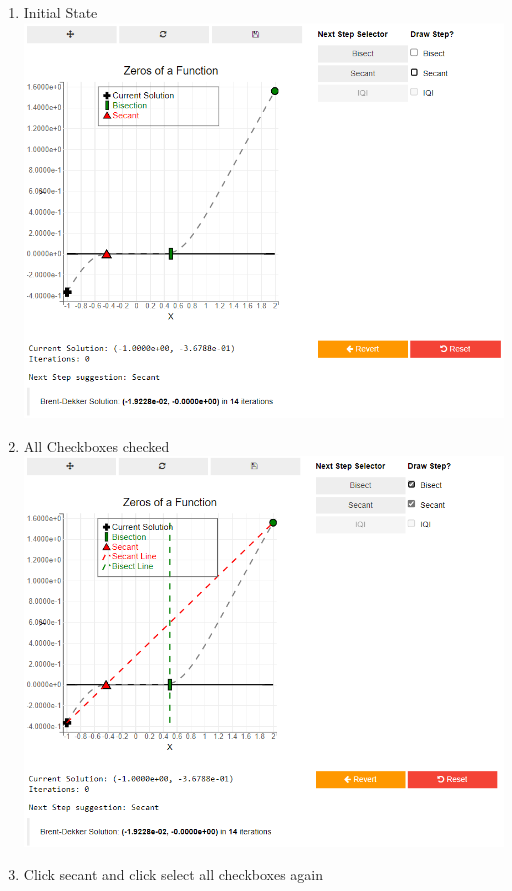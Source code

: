 \begin{enumerate}
    \item Initial State\\
    \includegraphics[scale=0.6]{Include/Images/Thesis/Documentation/Visualizers/NonLinear/Example 2/Example 2 - 00 - Initial State.png}
    \item All Checkboxes checked\\
    \includegraphics[scale=0.6]{Include/Images/Thesis/Documentation/Visualizers/NonLinear/Example 2/Example 2 - 01 - All Check Boxes.png}
    \item Click secant and click select all checkboxes again\\

\end{enumerate}
